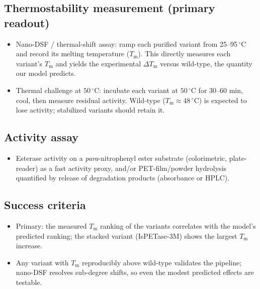 \documentclass[11pt]{article}
\begin{document}
\subsection{Thermostability measurement (primary readout)}
\begin{itemize}
\item Nano-DSF / thermal-shift assay: ramp each purified variant from 25--95$\,^{\circ}$C and
record its melting temperature ($T_\mathrm{m}$). This directly measures each variant's
$T_\mathrm{m}$ and yields the experimental $\Delta T_\mathrm{m}$ versus wild-type, the
quantity our model predicts.
\item Thermal challenge at $50\,^{\circ}$C: incubate each variant at $50\,^{\circ}$C for
30--60 min, cool, then measure residual activity. Wild-type ($T_\mathrm{m}\approx48\,^{\circ}$C)
is expected to lose activity; stabilized variants should retain it.
\end{itemize}
\subsection{Activity assay}
\begin{itemize}
\item Esterase activity on a \emph{para}-nitrophenyl ester substrate (colorimetric,
plate-reader) as a fast activity proxy, and/or PET-film/powder hydrolysis quantified by
release of degradation products (absorbance or HPLC).
\end{itemize}
\subsection{Success criteria}
\begin{itemize}
\item Primary: the measured $T_\mathrm{m}$ ranking of the variants correlates with the model's
predicted ranking; the stacked variant (IsPETase-3M) shows the largest $T_\mathrm{m}$ increase.
\item Any variant with $T_\mathrm{m}$ reproducibly above wild-type validates the pipeline;
nano-DSF resolves sub-degree shifts, so even the modest predicted effects are testable.
\end{itemize}
\end{document}
